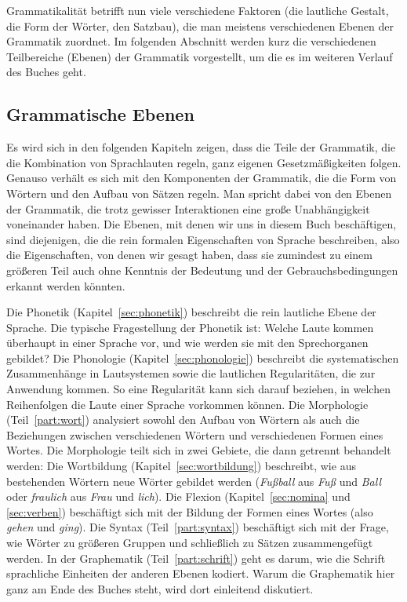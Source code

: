 Grammatikalität betrifft nun viele verschiedene Faktoren (\zB die lautliche Gestalt, die Form der Wörter, den Satzbau), die man meistens verschiedenen Ebenen der Grammatik zuordnet.
Im folgenden Abschnitt werden kurz die verschiedenen Teilbereiche (Ebenen) der Grammatik vorgestellt, um die es im weiteren Verlauf des Buches geht.

\subsection{Grammatische Ebenen}

\label{sec:grebenen}


Es wird sich in den folgenden Kapiteln zeigen, dass die Teile der Grammatik, die \zB die Kombination von Sprachlauten regeln, ganz eigenen Gesetzmäßigkeiten folgen.
Genauso verhält es sich mit den Komponenten der Grammatik, die die Form von Wörtern und den Aufbau von Sätzen regeln.
Man spricht dabei von den Ebenen der Grammatik, die trotz gewisser Interaktionen eine große Unabhängigkeit voneinander haben.
Die Ebenen, mit denen wir uns in diesem Buch beschäftigen, sind diejenigen, die die rein formalen Eigenschaften von Sprache beschreiben, also die Eigenschaften, von denen wir gesagt haben, dass sie zumindest zu einem größeren Teil auch ohne Kenntnis der Bedeutung und der Gebrauchsbedingungen erkannt werden könnten.

Die Phonetik (Kapitel~\ref{sec:phonetik}) beschreibt die rein lautliche Ebene der Sprache.
Die typische Fragestellung der Phonetik ist:
Welche Laute kommen überhaupt in einer Sprache vor, und wie werden sie mit den Sprechorganen gebildet?
Die Phonologie (Kapitel~\ref{sec:phonologie}) beschreibt die systematischen Zusammenhänge in Lautsystemen sowie die lautlichen Regularitäten, die zur Anwendung kommen.
So eine Regularität kann sich \zB darauf beziehen, in welchen Reihenfolgen die Laute einer Sprache vorkommen können.
Die Morphologie (Teil~\ref{part:wort}) analysiert sowohl den Aufbau von Wörtern als auch die Beziehungen zwischen verschiedenen Wörtern und verschiedenen Formen eines Wortes.
Die Morphologie teilt sich in zwei Gebiete, die dann getrennt behandelt werden:
Die Wortbildung (Kapitel~\ref{sec:wortbildung}) beschreibt, wie aus bestehenden Wörtern neue Wörter gebildet werden (\zB \textit{Fußball} aus \textit{Fuß} und \textit{Ball} oder \textit{fraulich} aus \textit{Frau} und \textit{lich}).
Die Flexion (Kapitel~\ref{sec:nomina} und \ref{sec:verben}) beschäftigt sich mit der Bildung der Formen eines Wortes (also \zB \textit{gehen} und \textit{ging}). 
Die Syntax (Teil~\ref{part:syntax}) beschäftigt sich mit der Frage, wie Wörter zu größeren Gruppen und schließlich zu Sätzen zusammengefügt werden.
In der Graphematik (Teil~\ref{part:schrift}) geht es darum, wie die Schrift sprachliche Einheiten der anderen Ebenen kodiert.
Warum die Graphematik hier ganz am Ende des Buches steht, wird dort einleitend diskutiert.

